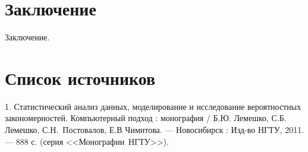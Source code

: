 \documentclass[a4paper,12pt]{article}
\begin{document}
\section*{Заключение}

Заключение.

\section*{Список источников}


1. Статистический анализ данных, моделирование и исследование вероятностных
закономерностей. Компьютерный подход : монография / Б.Ю. Лемешко, С.Б. Лемешко,
\mbox{С.Н. Постовалов}, Е.В Чимитова. --- Новосибирск : Изд-во НГТУ, 2011. --- 888 с.
(серия <<\mbox{Монографии НГТУ}>>).
\end{document}
